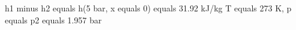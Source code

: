 h1 minus h2 equals h(5 bar, x equals 0) equals 31.92 kJ/kg
T equals 273 K, p equals p2 equals 1.957 bar